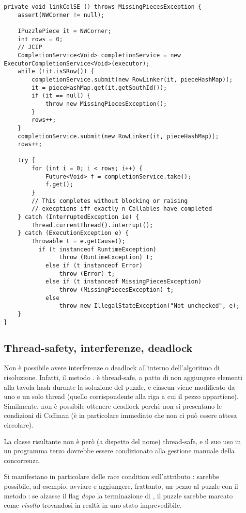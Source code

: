 \documentclass[a4paper]{article}
\begin{document}
\begin{verbatim}
private void linkColSE () throws MissingPiecesException {
	assert(NWCorner != null);
	
	IPuzzlePiece it = NWCorner;
	int rows = 0;
	// JCIP
	CompletionService<Void> completionService = new ExecutorCompletionService<Void>(executor);
	while (!it.isSRow()) {
		completionService.submit(new RowLinker(it, pieceHashMap));
		it = pieceHashMap.get(it.getSouthId());
		if (it == null) {
			throw new MissingPiecesException();
		}
		rows++;
	}
	completionService.submit(new RowLinker(it, pieceHashMap));
	rows++;

	try {
		for (int i = 0; i < rows; i++) {
			Future<Void> f = completionService.take();
			f.get();
		}
		// This completes without blocking or raising
		// execptions iff exactly n Callables have completed
	} catch (InterruptedException ie) {
		Thread.currentThread().interrupt();
	} catch (ExecutionException e) {
		Throwable t = e.getCause();
		  if (t instanceof RuntimeException) 
	            throw (RuntimeException) t;
	        else if (t instanceof Error)
	            throw (Error) t;
	        else if (t instanceof MissingPiecesException)
	        	throw (MissingPiecesException) t;
	        else
	            throw new IllegalStateException("Not unchecked", e);
	}
}

\end{verbatim}


\subsection{Thread-safety, interferenze, deadlock}
Non \`e possibile avere interferenze o deadlock all'interno dell'algoritmo di risoluzione.
Infatti, il metodo . \`e thread-safe, a patto di non aggiungere elementi alla tavola hash durante la soluzione del puzzle, e ciascun  viene modificato da uno e un solo thread (quello corrispondente alla riga a cui il pezzo appartiene).
Similmente, non \`e possibile ottenere deadlock perch\`e non si presentano le condizioni di Coffman (\`e in particolare immediato che non ci pu\`o essere attesa circolare).

La classe risultante non \`e per\`o (a dispetto del nome) thread-safe, e il suo uso in un programma terzo dovrebbe essere condizionato alla gestione manuale della concorrenza.

Si manifestano in particolare delle race condition sull'attributo : sarebbe possibile, ad esempio, avviare  e aggiungere, frattanto, un pezzo al puzzle con il metodo : se  alzasse il flag  \emph{dopo} la terminazione di , il puzzle sarebbe marcato come \emph{risolto} trovandosi in realt\`a in uno stato imprevedibile.
\end{document}
